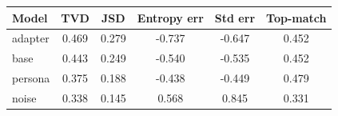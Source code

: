 \begin{tabular}{lccccc}
\toprule
Model & TVD & JSD & Entropy err & Std err & Top-match \\
\midrule
adapter & 0.469 & 0.279 & -0.737 & -0.647 & 0.452 \\
base & 0.443 & 0.249 & -0.540 & -0.535 & 0.452 \\
persona & 0.375 & 0.188 & -0.438 & -0.449 & 0.479 \\
noise & 0.338 & 0.145 & 0.568 & 0.845 & 0.331 \\
\bottomrule
\end{tabular}
